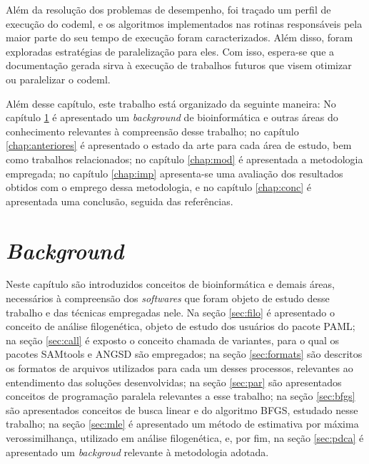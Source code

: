 \documentclass[cic,tc]{iiufrgs}
\begin{document}
Além da resolução dos problemas de desempenho, foi traçado um perfil de
execução do codeml, e os algoritmos implementados nas rotinas responsáveis pela
maior parte do seu tempo de execução foram caracterizados. Além disso, foram
exploradas estratégias de paralelização para eles. Com isso, espera-se que a
documentação gerada sirva à execução de trabalhos futuros que visem otimizar ou
paralelizar o codeml.

%
%
Além desse capítulo, este trabalho está organizado da seguinte maneira: No
capítulo \ref{chap:bg} é apresentado um \textit{background} de bioinformática e
outras áreas do conhecimento relevantes à compreensão desse trabalho; no
capítulo \ref{chap:anteriores} é apresentado o estado da arte para cada área de
estudo, bem como trabalhos relacionados; no capítulo \ref{chap:mod} é
apresentada a metodologia empregada; no capítulo \ref{chap:imp} apresenta-se
uma avaliação dos resultados obtidos com o emprego dessa metodologia, e no
capítulo \ref{chap:conc} é apresentada uma conclusão, seguida das referências.

%
%
%
%

\chapter{\textit{Background}}
\label{chap:bg}

Neste capítulo são introduzidos conceitos de bioinformática e demais áreas,
necessários à compreensão dos \textit{softwares} que foram objeto de estudo desse
trabalho e das técnicas empregadas nele. Na seção \ref{sec:filo} é apresentado o
conceito de análise filogenética, objeto de estudo dos usuários do pacote PAML;
na seção \ref{sec:call} é exposto o conceito chamada de variantes, para o qual
os pacotes SAMtools e ANGSD são empregados; na seção \ref{sec:formats} são
descritos os formatos de arquivos utilizados para cada um desses processos,
relevantes ao entendimento das soluções desenvolvidas; na seção \ref{sec:par}
são apresentados conceitos de programação paralela relevantes
a esse trabalho; na seção \ref{sec:bfgs} são apresentados conceitos de busca
linear e do algoritmo BFGS, estudado nesse trabalho; na seção \ref{sec:mle} é
apresentado um método de estimativa por máxima verossimilhança, utilizado em
análise filogenética, e, por fim, na seção \ref{sec:pdca} é apresentado um
\textit{backgroud} relevante à metodologia adotada.

\end{document}
